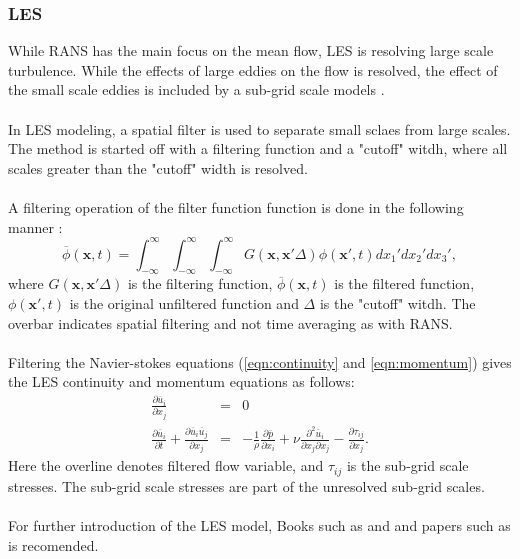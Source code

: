 \documentclass[a4paper, 12pt]{report}
\begin{document}
\subsubsection{LES}
While RANS has the main focus on the mean flow, LES is resolving large scale turbulence. While the effects of large eddies on the flow is resolved, the effect of the small scale eddies is included by a sub-grid scale models \cite{CFD}. \\
\\
In LES modeling, a spatial filter is used to separate small sclaes from large scales. The method is started off with a filtering function and a "cutoff" witdh, where all scales greater than the "cutoff" width is resolved. \\
\\
A filtering operation  of the filter function function is done in the following manner \cite{CFD}:
\begin{equation}
\overline{\phi}(\mathbf{x}, t) = \int_{-\infty}^{\infty}\int_{-\infty}^{\infty}\int_{-\infty}^{\infty} G(\mathbf{x}, \mathbf{x'} \Delta)\phi(\mathbf{x'},t)dx_1'dx_2'dx_3',
\label{eqn:filteringOperation}
\end{equation}
where $G(\mathbf{x}, \mathbf{x'} \Delta)$ is the filtering function, $\overline{\phi}(\mathbf{x}, t)$ is the filtered function, $\phi(\mathbf{x'},t)$ is the original unfiltered function and $\Delta$ is the "cutoff" witdh. The overbar indicates spatial filtering and not time averaging as with RANS.\\
\\
Filtering the Navier-stokes equations (\ref{eqn:continuity} and \ref{eqn:momentum}) gives the LES continuity and momentum equations as follows:
\begin{eqnarray}
\label{eqn:LEScontinuity}
\frac{\partial \overline{u}_i}{\partial x_j} &=&0\\
\label{eqn:LESmomentum}
\frac{\partial \overline{u}_i}{\partial t} +  \frac{\partial \overline{u}_i \overline{u}_j}{\partial x_j} &=& -\frac{1}{\rho} \frac{\partial \overline{p}}{\partial x_i} + \nu \frac{\partial ^2 \overline{u}_i}{\partial x_j \partial x_j} - \frac{\partial \tau_{ij}}{\partial x_j}.
\end{eqnarray}
Here the overline denotes filtered flow variable, and $\tau_{ij}$ is the sub-grid scale stresses. The sub-grid scale stresses are part of the unresolved sub-grid scales. \\
\\
For further introduction of the LES model, Books such as \cite{CFD} and \cite{LESTurbulence} and papers such as \cite{AppliedMathematicalModelling} is recomended. 
\end{document}
